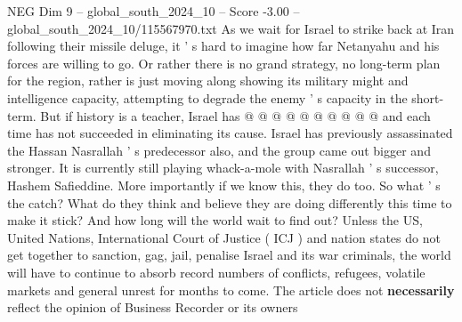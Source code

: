 \begin{textsample}{NEG Dim 9 – global\_south\_2024\_10 – Score -3.00 – global\_south\_2024\_10/115567970.txt}
As we wait for Israel to strike back at Iran following their missile deluge, it ' s hard to imagine how far Netanyahu and his forces are willing to go.
Or rather there is no grand strategy, no long-term plan for the region, rather is just moving along showing its military might and intelligence capacity, attempting to degrade the enemy ' s capacity in the short-term.
But if history is a teacher, Israel has @ @ @ @ @ @ @ @ @ @ and each time has not succeeded in eliminating its cause.
Israel has previously assassinated the Hassan Nasrallah ' s predecessor also, and the group came out bigger and stronger.
It is currently still playing whack-a-mole with Nasrallah ' s successor, Hashem Safieddine.
More importantly if we know this, they do too.
So what ' s the catch?
What do they think and believe they are doing differently this time to make it stick?
And how long will the world wait to find out?
Unless the US, United Nations, International Court of Justice ( ICJ ) and nation states do not get together to sanction, gag, jail, penalise Israel and its war criminals, the world will have to continue to absorb record numbers of conflicts, refugees, volatile markets and general unrest for months to come.
The article does not \textbf{necessarily} reflect the opinion of Business Recorder or its owners

\end{textsample}
